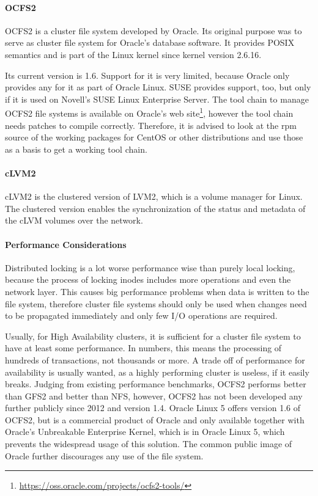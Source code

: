 \paragraph{OCFS2}
\ac{OCFS2} is a cluster file system developed by Oracle.
Its original purpose was to serve as cluster file system for Oracle's database software.
It provides POSIX semantics and is part of the Linux kernel since kernel version 2.6.16. 

Its current version is 1.6. Support for it is very limited, because Oracle only
provides any for it as part of Oracle Linux. SUSE provides support, too, but only
if it is used on Novell's SUSE Linux Enterprise Server. The tool chain to manage
OCFS2 file systems is available on Oracle's web site\footnote{\url{https://oss.oracle.com/projects/ocfs2-tools/}},
however the tool chain needs patches to compile correctly. Therefore, it is advised
to look at the rpm source of the working packages for CentOS or other distributions and use those as a basis
to get a working tool chain.
\paragraph{cLVM2}
cLVM2 is the clustered version of LVM2, which is a volume manager for Linux.
The clustered version enables the synchronization of the status and metadata
of the cLVM volumes over the network.

\paragraph{Performance Considerations}
Distributed locking is a lot worse performance wise than purely local locking,
because the process of locking inodes includes more operations and even the network layer.
This causes big performance problems when data is written to the file system,
therefore cluster file systems should only be used when changes need to be propagated immediately
and only few I/O operations are required.


Usually, for High Availability clusters, it is sufficient for a cluster file system
to have at least some performance. In numbers, this means the processing of 
hundreds of transactions, not thousands or more. A trade off of performance for
availability is usually wanted, as a highly performing cluster is useless, if
it easily breaks. Judging from existing performance benchmarks,
\ac{OCFS2} performs better than \ac{GFS2} and better than \ac{NFS}, however,
\ac{OCFS2} has not been developed any further publicly since 2012 and version 1.4.
Oracle Linux 5 offers version 1.6 of \ac{OCFS2}, but is a commercial product
of Oracle and only available together with Oracle's Unbreakable Enterprise
Kernel, which is in Oracle Linux 5, which prevents the widespread usage of this solution.
The common public image of Oracle further discourages any use of the file system.

